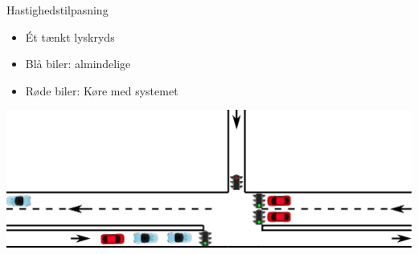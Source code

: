 \begin{frame}{Hastighedstilpasning}
\begin{itemize}
\item Ét tænkt lyskryds
\item Blå biler: almindelige
\item Røde biler: Køre med systemet
\end{itemize}
\includegraphics[width=1\textwidth]{images/eks2.png}
\end{frame}

